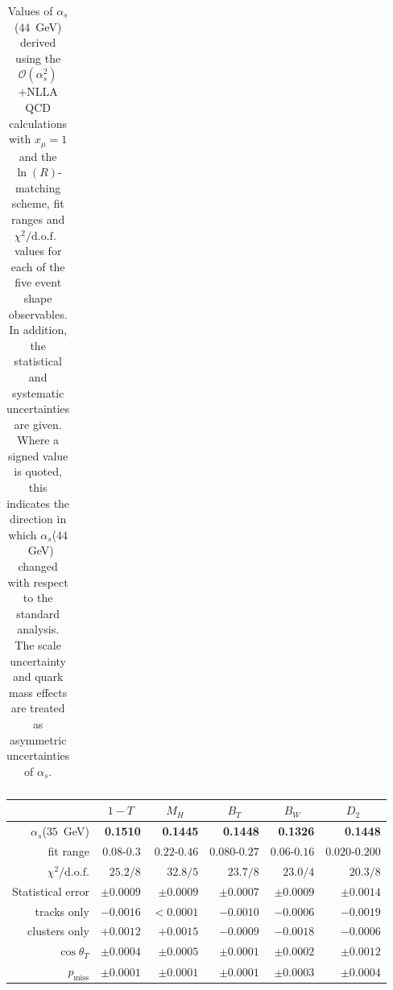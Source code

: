 \documentclass[12pt,a4paper,twoside]{article}
\newcommand{\as}     {\ensuremath{\alpha_s}}
\newcommand{\oaa}    {\ensuremath{\mathcal{O}(\alpha_s^2)}}
\newcommand{\bt}     {\ensuremath{B_T}}
\newcommand{\bw}     {\ensuremath{B_W}}
\newcommand{\mh}     {\ensuremath{M_H}}
\newcommand{\thr}    {\ensuremath{1-T}}
\newcommand{\chisqd} {\ensuremath{\chi^2/\mathrm{d.o.f.}}}
\newcommand{\xmu}    {\ensuremath{x_{\mu}}}
\newcommand{\dtwo}   {\ensuremath{D_2}}
\begin{document}
\begin{table}[!htb]
\begin{center}
\begin{tabular}{|r||r|r|r|r|r|}
\hline
\end{tabular}
\end{center}
\caption[dummy]{\label{tab-asresult-44GeV}
Values of \as($44$~GeV) derived using the \oaa+NLLA QCD calculations
with $\xmu=1$ and the $\ln(R)$-matching scheme, fit ranges and \chisqd\ %
values for each of the five event shape observables. In addition, the
statistical and systematic uncertainties are given. Where a signed value is
quoted, this indicates the direction in which \as($44$~GeV) changed with
respect to the standard analysis. The scale uncertainty and quark mass
effects are treated as asymmetric uncertainties of \as. 
}
\end{table}

\newpage

\begin{table}[!htb]
\vspace*{-7mm}
\begin{center}
\begin{tabular}{|r||r|r|r|r|r|}   \hline
 &\multicolumn{1}{c|}{\thr} &\multicolumn{1}{c|}{\mh}
 &\multicolumn{1}{c|}{\bt}  &\multicolumn{1}{c|}{\bw}
 &\multicolumn{1}{c|}{\dtwo}     \\
\hline\hline
\as($35$~GeV)     &\bf 0.1510  &\bf 0.1445  &\bf 0.1448  &\bf 0.1326  &\bf 0.1448   \\
\hline\hline
fit range         &$0.08$-$0.3$ 
                               & $0.22$-$0.46$ 
                                            & $0.080$-$0.27$ 
                                                         & $0.06$-$0.16$
                                                                  & $0.020$-$0.200$ \\
\hline\hline
\chisqd           & $25.2/8$   & $32.8/5$   & $23.7/8$   & $23.0/4$   & $20.3/8$    \\
\hline\hline
Statistical error &$\pm 0.0009$&$\pm 0.0009$&$\pm 0.0007$&$\pm 0.0009$&$\pm 0.0014$
\\ \hline\hline
tracks only       &  $-0.0016$ & $< 0.0001$ &  $-0.0010$ &  $-0.0006$ &  $-0.0019$  \\
\hline
clusters only     &  $+0.0012$ &  $+0.0015$ &  $-0.0009$ &  $-0.0018$ &  $-0.0006$  \\
\hline
$\cos\theta_T $ 
                  &$\pm 0.0004$&$\pm 0.0005$&$\pm 0.0001$&$\pm 0.0002$&$\pm 0.0012$  \\
\hline
$p_{\mathrm{miss}} $ 
                  &$\pm 0.0001$&$\pm 0.0001$&$\pm 0.0001$&$\pm 0.0003$&$\pm 0.0004$  \\
\hline

\end{tabular}
\end{center}
\end{table}
\end{document}
